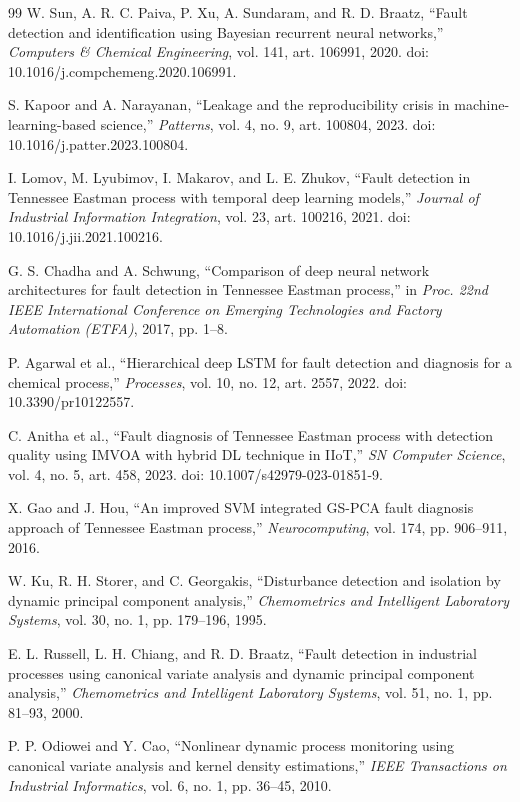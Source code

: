 \documentclass[12pt,a4paper]{article}
\begin{document}
\begin{thebibliography}{99}
W. Sun, A. R. C. Paiva, P. Xu, A. Sundaram, and R. D. Braatz, ``Fault detection
and identification using Bayesian recurrent neural networks,'' \emph{Computers
\& Chemical Engineering}, vol. 141, art. 106991, 2020.
doi: 10.1016/j.compchemeng.2020.106991.

S. Kapoor and A. Narayanan, ``Leakage and the reproducibility crisis in
machine-learning-based science,'' \emph{Patterns}, vol. 4, no. 9, art. 100804,
2023. doi: 10.1016/j.patter.2023.100804.

I. Lomov, M. Lyubimov, I. Makarov, and L. E. Zhukov, ``Fault detection in
Tennessee Eastman process with temporal deep learning models,'' \emph{Journal
of Industrial Information Integration}, vol. 23, art. 100216, 2021.
doi: 10.1016/j.jii.2021.100216.

G. S. Chadha and A. Schwung, ``Comparison of deep neural network architectures
for fault detection in Tennessee Eastman process,'' in \emph{Proc. 22nd IEEE
International Conference on Emerging Technologies and Factory Automation
(ETFA)}, 2017, pp. 1--8.

P. Agarwal et al., ``Hierarchical deep LSTM for fault detection and diagnosis
for a chemical process,'' \emph{Processes}, vol. 10, no. 12, art. 2557, 2022.
doi: 10.3390/pr10122557.

C. Anitha et al., ``Fault diagnosis of Tennessee Eastman process with detection
quality using IMVOA with hybrid DL technique in IIoT,'' \emph{SN Computer
Science}, vol. 4, no. 5, art. 458, 2023. doi: 10.1007/s42979-023-01851-9.

X. Gao and J. Hou, ``An improved SVM integrated GS-PCA fault diagnosis approach
of Tennessee Eastman process,'' \emph{Neurocomputing}, vol. 174, pp. 906--911,
2016.

W. Ku, R. H. Storer, and C. Georgakis, ``Disturbance detection and isolation by
dynamic principal component analysis,'' \emph{Chemometrics and Intelligent
Laboratory Systems}, vol. 30, no. 1, pp. 179--196, 1995.

E. L. Russell, L. H. Chiang, and R. D. Braatz, ``Fault detection in industrial
processes using canonical variate analysis and dynamic principal component
analysis,'' \emph{Chemometrics and Intelligent Laboratory Systems}, vol. 51,
no. 1, pp. 81--93, 2000.

P. P. Odiowei and Y. Cao, ``Nonlinear dynamic process monitoring using
canonical variate analysis and kernel density estimations,'' \emph{IEEE
Transactions on Industrial Informatics}, vol. 6, no. 1, pp. 36--45, 2010.

\end{thebibliography}
\end{document}
